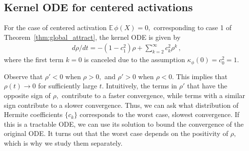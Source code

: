 \documentclass[twoside]{article}
\newcommand{\km}{\kappa_\phi}
\newcommand{\E}{\mathbb{E}\,}
\theoremstyle{definition}
\begin{document}

\subsection{Kernel ODE for centered activations}
For the case of centered activation $\E \phi(X)=0,$ corresponding to case 1 of Theorem~\ref{thm:global_attract}, the kernel ODE is given by
\begin{align*}
    d\rho/dt = -(1-c_1^2)\rho + \sum_{k=2}^\infty c_k^2\rho^k\,,
\end{align*}
where the first term $k=0$ is canceled due to the assumption $\km(0)=c_0^2 = 1.$ 

Observe that $\rho'<0$ when $\rho>0,$ and $\rho'>0$ when $\rho<0.$ This implies that $\rho(t) \to 0$ for sufficiently large $t.$ Intuitively, the terms in $\rho'$ that have the opposite sign of $\rho,$ contribute to a faster convergence, while terms with a similar sign contribute to a slower convergence. Thus, we can ask what distribution of Hermite coefficients $\{c_k\}$ corresponds to the worst case, slowest convergence. If this is a tractable ODE, we can use its solution to bound the convergence of the original ODE. It turns out that the worst case depends on the positivity of $\rho,$ which is why we study them separately.
\end{document}
